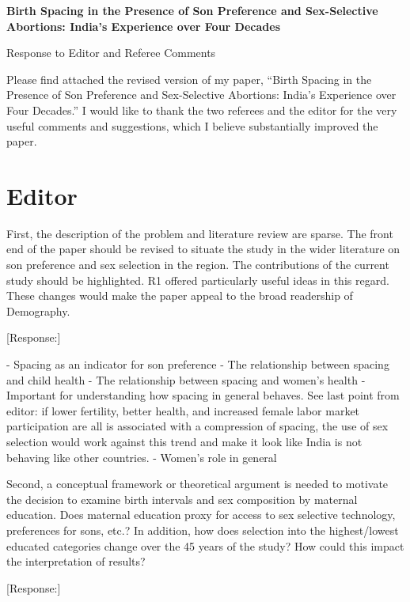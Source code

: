\documentclass[letterpaper,12pt]{article}
\title{} \author{}
\begin{document}
\begin{center} \textbf{\large Birth Spacing in the Presence of Son
Preference and 
Sex-Selective Abortions: India's Experience over Four Decades}
\end{center}

\begin{center} Response to Editor and Referee Comments \end{center}

\noindent Please find attached the revised version of my paper,
``Birth Spacing in the Presence of Son Preference and Sex-Selective
Abortions:
India's Experience over Four Decades.''
I would like to thank the two referees and the editor for the very useful comments and 
suggestions, which I believe substantially improved the paper.

\section*{Editor}

First, the description of the problem and literature review are sparse.
The front end of the paper should be revised to situate the study in the
wider literature on son preference and sex selection in the region. The
contributions of the current study should be highlighted. R1 offered
particularly useful ideas in this regard. These changes would make the
paper appeal to the broad readership of Demography.

[Response:]

- Spacing as an indicator for son preference
- The relationship between spacing and child health
- The relationship between spacing and women's health
- Important for understanding how spacing in general behaves. See last point from
editor: if lower fertility, better health, and increased female labor market participation 
are all is associated with a compression of spacing, the use of sex selection would
work against this trend and make it look like India is not behaving like other countries.
- Women's role in general

Second, a conceptual framework or theoretical argument is needed to
motivate the decision to examine birth intervals and sex composition by
maternal education. Does maternal education proxy for access to sex
selective technology, preferences for sons, etc.? In addition, how does
selection into the highest/lowest educated categories change over the 45
years of the study? How could this impact the interpretation of results?

[Response:]
\end{document}
